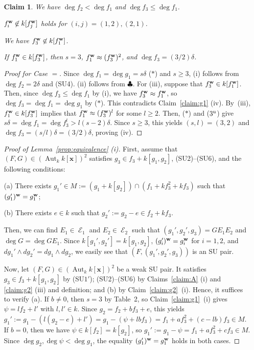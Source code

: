\documentclass{amsart}
\theoremstyle{plain}
\newtheorem{claim}{Claim}
\theoremstyle{definition}
\newcommand{\E }{{\mathop{\mathcal{E}}\nolimits}}
\newcommand{\Aut }{\mathop{\mathrm{Aut}}\nolimits}
\newcommand{\nd}{\noindent}
\newcommand{\x}{{\boldsymbol x}}
\newcommand{\w}{{\bf w}}
\newcommand{\kx}{k[\x]}
\begin{document}
\begin{claim}\label{claim:H}
\nd {\rm (i)} 
We have $\deg f_2<\deg f_1$ and $\deg f_3\leq \deg f_1$. 


\nd {\rm (ii)} 
$f_i^{\w }\not\in k[f_j^{\w }]$ holds for $(i,j)=(1,2),(2,1)$. 

\nd {\rm (iii)} 
We have $f_3^{\w }\not\in k[f_1^{\w }]$. 


\nd{\rm (iv)} 
If $f_1^{\w }\in k[f_3^{\w }]$, 
then $s=3$, 
$f_1^{\w }\approx (f_3^{\w })^2$, 
and $\deg f_3=(3/2)\delta $. 


\end{claim}
\begin{proof}[Proof for Case $=$] 
Since $\deg f_1=\deg g_1=s\delta $ ($*$) and $s\ge 3$, 
(i) follows from $\deg f_2=2\delta $ and (SU4). 
(ii) follows from $\clubsuit $. 
For (iii), 
suppose that $f_3^{\w }\in k[f_1^{\w }]$. 
Then, 
since $\deg f_3\leq \deg f_1$ by (i),  
we have $f_3^{\w }\approx f_1^{\w }$, 
so $\deg f_3=\deg f_1=\deg g_1$ by ($*$). 
This contradicts Claim~\ref{claim:g1} (iv). 
By~(iii), 
$f_1^{\w }\in k[f_3^{\w }]$ implies 
that $f_1^{\w }\approx (f_3^{\w })^l$ for some $l\ge 2$. 
Then, ($*$) and ($3^{\rm u}$) give 
$s\delta =\deg f_1=\deg f_3^l>l(s-2)\delta $. 
Since $s\ge 3$, 
this yields $(s,l)=(3,2)$ and $\deg f_3=(s/l)\delta =(3/2)\delta $, 
proving (iv). 
\end{proof}



\begin{proof}[Proof of Lemma~{\rm \ref{prop:equivalence} (i)}]
First, assume that 
$(F,G)\in (\Aut _k\kx )^2$ satisfies 
$g_3\in f_3+k[g_1,g_2]$, 
(SU2)--(SU6), 
and the following conditions: 

(a) 
There exists $g_1'\in M:=(g_1+k[g_2])\cap (f_1+kf_3^2+kf_3)$ 
such that $(g_1')^{\w }=g_1^{\w }$; 


(b) There exists $e\in k$ such that $g_2':=g_2-e\in f_2+kf_3$. 


\nd 
Then, 
we can find $E_1\in \E _1$ and $E_2\in \E _2$ 
such that $(g_1',g_2',g_3)=GE_1E_2$ 
and $\deg G=\deg GE_1$. 
Since 
$k[g_1',g_2']=k[g_1,g_2]$, 
$(g_i')^{\w }=g_i^{\w }$ for $i=1,2$, 
and $dg_1'\wedge dg_2'=dg_1\wedge dg_2$, 
we easily see that $(F,(g_1',g_2',g_3))$ is an SU pair. 


Now, 
let $(F,G)\in (\Aut _k\kx )^2$ be a weak SU pair. 
It satisfies $g_3\in f_3+k[g_1,g_2]$ by (SU$1'$); 
(SU2)--(SU6) by Claims~\ref{claim:A} (i) and \ref{claim:g2} (iii) 
and definition; 
and (b) by Claim~\ref{claim:g2}~(i). 
Hence, 
it suffices to verify (a). 
If $b\ne 0$, then $s=3$ by Table~2, 
so Claim~\ref{claim:g1}~(i) gives $\psi =lf_2+l'$ 
with $l,l'\in k$. 
Since $g_2=f_2+bf_3+e$, 
this yields 
$g_1':=g_1-(l(g_2-e)+l')=g_1-(\psi +lbf_3)=f_1+af_3^2+(c-lb)f_3\in M$. 
If $b=0$, then we have $\psi \in k[f_2]=k[g_2]$, 
so $g_1':=g_1-\psi =f_1+af_3^2+cf_3\in M$. 
Since $\deg g_2,\deg \psi <\deg g_1$, 
the equality $(g_1')^{\w }=g_1^{\w }$ holds in both cases. 
\end{proof}
\end{document}
